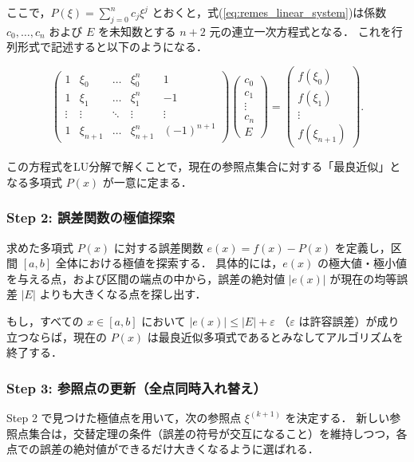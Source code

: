 ここで，$P(\xi) = \sum_{j=0}^n c_j \xi^j$ とおくと，式(\ref{eq:remes_linear_system})は係数 $c_0, \dots, c_n$ および $E$ を未知数とする $n+2$ 元の連立一次方程式となる．
これを行列形式で記述すると以下のようになる．

\begin{equation}
    \left(
    \begin{array}{ccccc}
    1 & \xi_0 & \dots & \xi_0^n & 1 \\
    1 & \xi_1 & \dots & \xi_1^n & -1 \\
    \vdots & \vdots & \ddots & \vdots & \vdots \\
    1 & \xi_{n+1} & \dots & \xi_{n+1}^n & (-1)^{n+1}
    \end{array}
    \right)
    \left(
    \begin{array}{c}
    c_0 \\
    c_1 \\
    \vdots \\
    c_n \\
    E
    \end{array}
    \right)
    =
    \left(
    \begin{array}{c}
    f(\xi_0) \\
    f(\xi_1) \\
    \vdots \\
    f(\xi_{n+1})
    \end{array}
    \right).
\end{equation}

この方程式をLU分解で解くことで，現在の参照点集合に対する「最良近似」となる多項式 $P(x)$ が一意に定まる．

\subsubsection{Step 2: 誤差関数の極値探索}
求めた多項式 $P(x)$ に対する誤差関数 $e(x) = f(x) - P(x)$ を定義し，区間 $[a, b]$ 全体における極値を探索する．
具体的には，$e(x)$ の極大値・極小値を与える点，および区間の端点の中から，誤差の絶対値 $|e(x)|$ が現在の均等誤差 $|E|$ よりも大きくなる点を探し出す．

もし，すべての $x \in [a, b]$ において $|e(x)| \le |E| + \varepsilon$ （$\varepsilon$ は許容誤差）が成り立つならば，現在の $P(x)$ は最良近似多項式であるとみなしてアルゴリズムを終了する．

\subsubsection{Step 3: 参照点の更新（全点同時入れ替え）}
Step 2 で見つけた極値点を用いて，次の参照点 $\xi^{(k+1)}$ を決定する．
新しい参照点集合は，交替定理の条件（誤差の符号が交互になること）を維持しつつ，各点での誤差の絶対値ができるだけ大きくなるように選ばれる．

